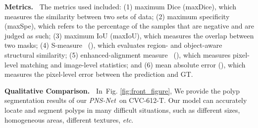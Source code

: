 \documentclass[runningheads]{llncs}
\newcommand{\figref}[1]{Fig. \ref{#1}}
\def\etc{\emph{etc}}
\def\ourmodel{\textit{PNS-Net}}
\newcommand{\myPara}[1]{\noindent\textbf{#1~}}
\begin{document}
\myPara{Metrics.} 
The metrics used included:
(1) maximum Dice (maxDice), which measures the similarity between two sets of data;
(2) maximum specificity (maxSpe), which refers to the percentage of the samples that are negative and are judged as such;
(3) maximum IoU (maxIoU), which measures the overlap between two masks;
(4) S-measure~\cite{fan2017structure} (), which evaluates region- and object-aware structural similarity;
(5) enhanced-alignment measure~\cite{21SC-Emeasure} (), which measures pixel-level matching and image-level statistics;
and (6) mean absolute error (), which measures the pixel-level error between the prediction and GT.


\myPara{Qualitative Comparison.}
In~\figref{fig:front_figure}, We provide the polyp segmentation results of our \ourmodel~on CVC-612-T. Our model can accurately locate and segment polyps in many difficult situations, such as different sizes, homogeneous areas, different textures, \etc.
\end{document}
